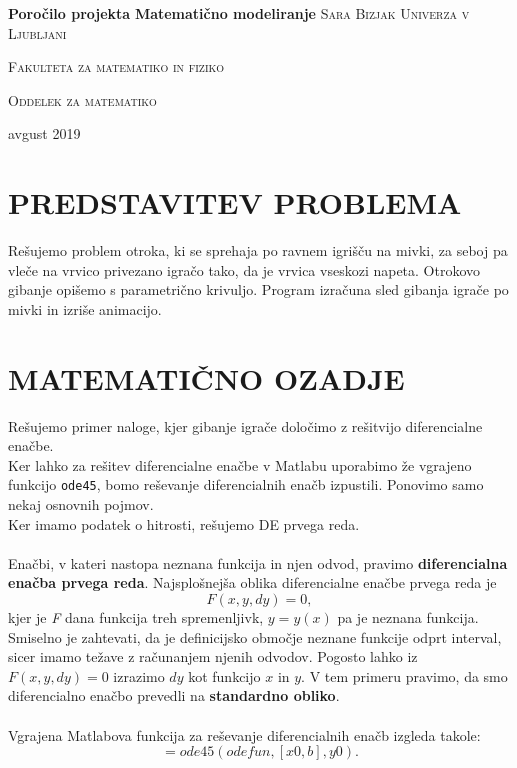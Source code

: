 \documentclass[a4paper,12pt]{article}
\begin{document}

\begin{titlepage}
    \centering
    \vfill
    \vfill
    \textbf{\Huge{Poročilo projekta}}
    \vfill
    \textbf{\LARGE{Matematično modeliranje}}
    \vfill\vfill\vfill\vfill\vfill
    \textsc{\Large{Sara Bizjak}}
    \vfill\vfill
    \textsc{\large{Univerza v Ljubljani}}
    
    \textsc{\large{Fakulteta za matematiko in fiziko}}
    
    \textsc{\large{Oddelek za matematiko}}
    \vfill\vfill
        
    \large{avgust 2019}
    
    \end{titlepage}

\newpage

\tableofcontents

\newpage

\section{\textsc{\large{PREDSTAVITEV PROBLEMA}}}

Rešujemo problem otroka, ki se sprehaja po ravnem igrišču na mivki, za seboj pa vleče na 
vrvico privezano igračo tako, da je vrvica vseskozi napeta. Otrokovo gibanje opišemo s 
parametrično krivuljo. Program izračuna sled gibanja igrače po mivki in izriše animacijo.
\\

\section{\textsc{\large{MATEMATIČNO OZADJE}}}

Rešujemo primer naloge, kjer gibanje igrače določimo z rešitvijo diferencialne enačbe. \\
Ker lahko za rešitev diferencialne enačbe v Matlabu uporabimo že vgrajeno funkcijo {\texttt{ode45}}, bomo reševanje diferencialnih enačb izpustili. 
Ponovimo samo nekaj osnovnih pojmov.
\\
Ker imamo podatek o hitrosti, rešujemo DE prvega reda.
\\
\\
Enačbi, v kateri nastopa neznana funkcija in njen odvod, pravimo \textbf{diferencialna enačba prvega reda}. 
Najsplošnejša oblika diferencialne enačbe prvega reda je
\begin{displaymath}
F(x, y, dy) = 0,
\end{displaymath}
kjer je \textit{F} dana funkcija treh spremenljivk, $y = y(x)$ pa je neznana funkcija.
Smiselno je zahtevati, da je definicijsko območje neznane funkcije odprt interval,
sicer imamo težave z računanjem njenih odvodov.
Pogosto lahko iz $F(x, y, dy) = 0$ izrazimo $dy$ kot funkcijo $x$ in $y$. V tem primeru pravimo,
da smo diferencialno enačbo prevedli na \textbf{standardno obliko}.
\\
\\
Vgrajena Matlabova funkcija za reševanje diferencialnih enačb izgleda takole:
\begin{displaymath}
[X, Y] = ode45(odefun, [x0, b], y0).
\end{displaymath}
\end{document}
